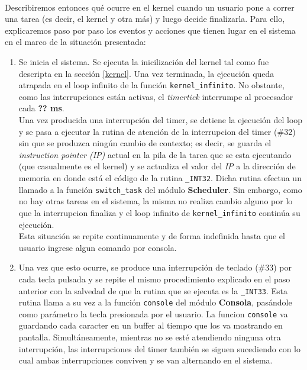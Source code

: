 \documentclass[11pt, a4paper]{article}
\begin{document}
	\paragraph{}
	Describiremos entonces qué ocurre en el kernel cuando un usuario pone a correr una tarea (es decir, el kernel y otra más) y luego decide finalizarla. Para ello, explicaremos paso por paso los eventos y acciones que tienen lugar en el sistema en el marco de la situación presentada:
	\begin{enumerate}
		\item Se inicia el sistema. Se ejecuta la inicilización del kernel tal como fue descripta en la sección  \ref{kernel}. Una vez terminada, la ejecución queda atrapada en el loop infinito de la función \texttt{kernel\_infinito}. No obstante, como las interrupciones están activas, el \textit{timertick} interrumpe al procesador cada \textbf{?? ms}.\\
		Una vez producida una interrupción del timer, se detiene la ejecución del loop y se pasa a ejecutar la rutina de atención de la interrupcion del timer (\#32) sin que se produzca ningún cambio de contexto; es decir, se guarda el \textit{instruction pointer (IP)} actual en la pila de la tarea que se esta ejecutando (que casualmente es el kernel) y se actualiza el valor del \textit{IP} a la dirección de memoria en donde está el código de la rutina \texttt{\_INT32}. Dicha rutina efectua un llamado a la función \texttt{switch\_task} del módulo \textbf{Scheduler}. Sin embargo, como no hay otras tareas en el sistema, la misma no realiza cambio alguno por lo que la interrupcion finaliza y el loop infinito de \texttt{kernel\_infinito} continúa su ejecución.\\
		Esta situación se repite continuamente y de forma indefinida hasta que el usuario ingrese algun comando por consola.
		\item Una vez que esto ocurre, se produce una interrupción de teclado (\#33) por cada tecla pulsada y se repite el mismo procedimiento explicado en el paso anterior con la salvedad de que la rutina que se ejecuta es la \texttt{\_INT33}. Esta rutina llama a su vez a la función \texttt{console} del módulo \textbf{Consola}, pasándole como parámetro la tecla presionada por el usuario. La funcion \texttt{console} va guardando cada caracter en un buffer al tiempo que los va mostrando en pantalla. Simultáneamente, mientras no se esté atendiendo ninguna otra interrupción, las interrupciones del timer también se siguen sucediendo con lo cual ambas interrupciones conviven y se van alternando en el sistema. \\

\end{enumerate}
\end{document}
